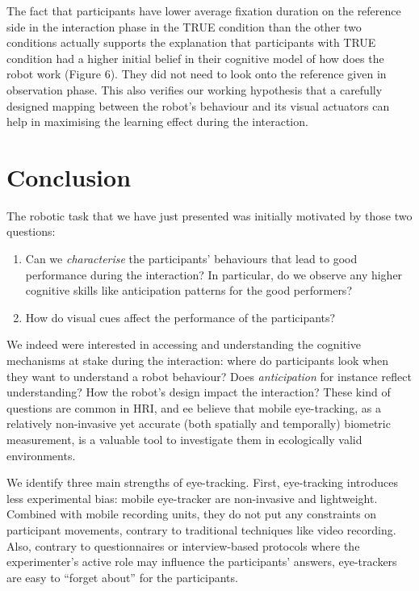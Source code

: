 \documentclass{sig-alternate}
\begin{document}
The fact that participants have lower average fixation duration on the
reference side in the interaction phase in the {\sf TRUE} condition than the
other two conditions actually supports the explanation that participants
with {\sf TRUE} condition had a higher initial belief in their cognitive model
of how does the robot work (Figure 6). They did not need to look onto
the reference given in observation phase. This also verifies our working
hypothesis that a carefully designed mapping between the robot's
behaviour and its visual actuators can help in maximising the learning
effect during the interaction.




\section{Conclusion}
\label{conclusion}

The robotic task that we have just presented was initially motivated by those
two questions:

\begin{enumerate}
    \item Can we \emph{characterise} the participants' behaviours that
        lead to good performance during the interaction? In particular, do
        we observe any higher cognitive skills like anticipation patterns for
        the good performers?

    \item How do visual cues affect the performance of the participants?

\end{enumerate}

We indeed were interested in accessing and understanding the cognitive
mechanisms at stake during the interaction: where do participants look when they
want to understand a robot behaviour? Does \emph{anticipation} for instance
reflect understanding? How the robot's design impact the interaction? These kind
of questions are common in HRI, and ee believe that mobile eye-tracking, as a
relatively non-invasive yet accurate (both spatially and temporally) biometric
measurement, is a valuable tool to investigate them in ecologically
valid environments.

We identify three main strengths of eye-tracking. First, eye-tracking introduces
less experimental bias: mobile eye-tracker are non-invasive and lightweight.
Combined with mobile recording units, they do not put any constraints on
participant movements, contrary to traditional techniques like video recording.
Also, contrary to questionnaires or interview-based protocols where the
experimenter's active role may influence the participants' answers, eye-trackers
are easy to ``forget about'' for the participants.
\end{document}

